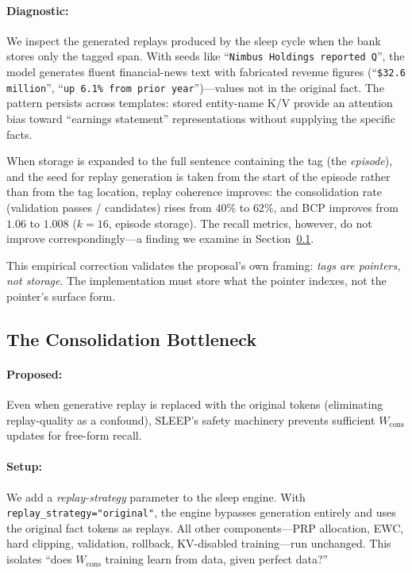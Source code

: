\paragraph{Diagnostic:} We inspect the generated replays produced by the sleep cycle when the bank stores only the tagged span. With seeds like ``\texttt{Nimbus Holdings reported Q}'', the model generates fluent financial-news text with fabricated revenue figures (``\texttt{\$32.6 million}'', ``\texttt{up 6.1\% from prior year}'')---values not in the original fact. The pattern persists across templates: stored entity-name K/V provide an attention bias toward ``earnings statement'' representations without supplying the specific facts.

When storage is expanded to the full sentence containing the tag (the \emph{episode}), and the seed for replay generation is taken from the start of the episode rather than from the tag location, replay coherence improves: the consolidation rate (validation passes / candidates) rises from $40\%$ to $62\%$, and BCP improves from $1.06$ to $1.008$ ($k=16$, episode storage). The recall metrics, however, do not improve correspondingly---a finding we examine in Section~\ref{sec:results_consolidation}.

This empirical correction validates the proposal's own framing: \emph{tags are pointers, not storage}. The implementation must store what the pointer indexes, not the pointer's surface form.

\subsection{The Consolidation Bottleneck}
\label{sec:results_consolidation}

\paragraph{Proposed:} Even when generative replay is replaced with the original tokens (eliminating replay-quality as a confound), SLEEP's safety machinery prevents sufficient $W_{\mathrm{cons}}$ updates for free-form recall.

\paragraph{Setup:} We add a \emph{replay-strategy} parameter to the sleep engine. With \texttt{replay\_strategy="original"}, the engine bypasses generation entirely and uses the original fact tokens as replays. All other components---PRP allocation, EWC, hard clipping, validation, rollback, KV-disabled training---run unchanged. This isolates ``does $W_{\mathrm{cons}}$ training learn from data, given perfect data?''

